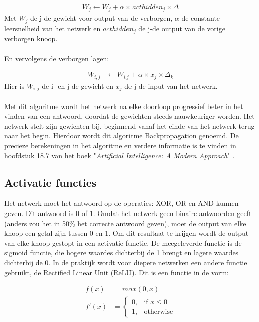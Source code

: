 \documentclass[10pt]{article}
\begin{document}
\begin{align*}
    W_j \leftarrow W_j + \alpha \times acthidden_j \times \Delta
\end{align*}
Met $W_j$ de j-de gewicht voor output van de verborgen, $\alpha$ de constante leersnelheid van het netwerk en $acthidden_j$ de j-de output van de vorige verborgen knoop.
\\\\
En vervolgens de verborgen lagen:

\begin{align*}
    W_{i,j} & \leftarrow W_{i.j} + \alpha \times x_j \times \Delta_k
\end{align*}
Hier is $W_{i,j}$ de i -en j-de gewicht en $x_j$ de j-de input van het netwerk.
\\\\
Met dit algoritme wordt het netwerk na elke doorloop progressief beter in het vinden van een antwoord, doordat de gewichten steeds nauwkeuriger worden. Het netwerk stelt zijn gewichten bij, beginnend vanaf het einde van het netwerk terug naar het begin. Hierdoor wordt dit algoritme Backpropagation genoemd. De precieze berekeningen in het algoritme en verdere informatie is te vinden in hoofdstuk 18.7 van het boek "\textit{Artificial Intelligence: A Modern Approach}" \cite{chapter}.

\subsection{Activatie functies}
Het netwerk moet het antwoord op de operaties: XOR, OR en AND kunnen geven. Dit antwoord is 0 of 1. Omdat het netwerk geen binaire antwoorden geeft (anders zou het in 50\% het correcte antwoord geven), moet de output van elke knoop een getal zijn tussen 0 en 1. Om dit resultaat te krijgen wordt de output van elke knoop gestopt in een activatie functie. De meegeleverde functie is de sigmoid functie, die hogere waardes dichterbij de 1 brengt en lagere waardes dichterbij de 0. In de praktijk wordt voor diepere netwerken een andere functie gebruikt, de Rectified Linear Unit (ReLU). Dit is een functie in de vorm:

\begin{align*}
    f(x) & = max(0,x) \\
    f'(x) & =
            \begin{cases}
                0,& \text{if } x\leq 0\\
                1,& \text{otherwise}
            \end{cases}
\end{align*}
\end{document}
